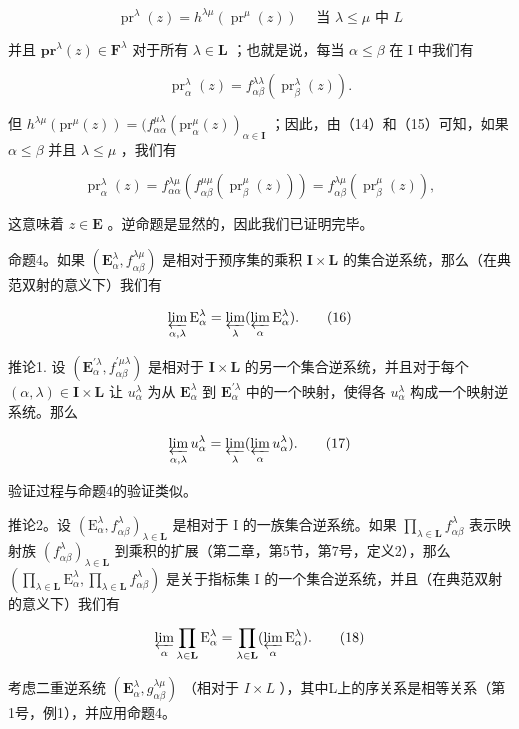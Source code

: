 \[
\operatorname{pr} ^ {\lambda} (z) = h ^ {\lambda \mu} (\operatorname{pr} ^ {\mu} (z)) \quad \text { 当 } \lambda \leqslant \mu \text { 中 } L\tag{14}
\]

并且 \(\mathbf{pr}^{\lambda}(z) \in \mathbf{F}^{\lambda}\) 对于所有 \(\lambda \in \mathbf{L}\) ；也就是说，每当 \(\alpha \leqslant \beta\) 在 I 中我们有

\[
\operatorname{pr} _ {\alpha} ^ {\lambda} (z) = f _ {\alpha \beta} ^ {\lambda \lambda} (\operatorname{pr} _ {\beta} ^ {\lambda} (z)).\tag{15}
\]

但 \(h^{\lambda \mu}(\mathrm{pr}^{\mu}(z)) = (f_{\alpha \alpha}^{\mu \lambda}(\mathrm{pr}_{\alpha}^{\mu}(z))_{\alpha \in \mathbf{I}}\) ；因此，由（14）和（15）可知，如果 \(\alpha \leqslant \beta\) 并且 \(\lambda \leqslant \mu\) ，我们有

\[
\operatorname{pr} _ {\alpha} ^ {\lambda} (z) = f _ {\alpha \alpha} ^ {\lambda \mu} (f _ {\alpha \beta} ^ {\mu \mu} (\operatorname{pr} _ {\beta} ^ {\mu} (z))) = f _ {\alpha \beta} ^ {\lambda \mu} (\operatorname{pr} _ {\beta} ^ {\mu} (z)),
\]

这意味着 \(z \in \mathbf{E}\) 。逆命题是显然的，因此我们已证明完毕。

命题4。如果 \((\mathbf{E}_{\alpha}^{\lambda}, f_{\alpha \beta}^{\lambda \mu})\) 是相对于预序集的乘积 \(\mathbf{I} \times \mathbf{L}\) 的集合逆系统，那么（在典范双射的意义下）我们有

\[
\varprojlim_ {\alpha , \lambda} \mathrm{E} _ {\alpha} ^ {\lambda} = \varprojlim_ {\lambda} (\varprojlim_ {\alpha} \mathrm{E} _ {\alpha} ^ {\lambda}).\tag{16}
\]

推论1. 设 \((\mathbf{E}_{\alpha}^{\prime \lambda}, f_{\alpha \beta}^{\prime \mu \lambda})\) 是相对于 \(\mathbf{I} \times \mathbf{L}\) 的另一个集合逆系统，并且对于每个 \((\alpha, \lambda) \in \mathbf{I} \times \mathbf{L}\) 让 \(u_{\alpha}^{\lambda}\) 为从 \(\mathbf{E}_{\alpha}^{\lambda}\) 到 \(\mathbf{E}_{\alpha}^{\prime \lambda}\) 中的一个映射，使得各 \(u_{\alpha}^{\lambda}\) 构成一个映射逆系统。那么

\[
\varprojlim_ {\alpha , \lambda} u _ {\alpha} ^ {\lambda} = \varprojlim_ {\lambda} (\varprojlim_ {\alpha} u _ {\alpha} ^ {\lambda}).\tag{17}
\]

验证过程与命题4的验证类似。

推论2。设 \((\mathrm{E}_{\alpha}^{\lambda}, f_{\alpha \beta}^{\lambda})_{\lambda \in \mathbf{L}}\) 是相对于 I 的一族集合逆系统。如果 \(\prod_{\lambda \in \mathbf{L}} f_{\alpha \beta}^{\lambda}\) 表示映射族 \((f_{\alpha \beta}^{\lambda})_{\lambda \in \mathbf{L}}\) 到乘积的扩展（第二章，第5节，第7号，定义2），那么 \(\left(\prod_{\lambda \in \mathbf{L}} \mathrm{E}_{\alpha}^{\lambda}, \prod_{\lambda \in \mathbf{L}} f_{\alpha \beta}^{\lambda}\right)\) 是关于指标集 I 的一个集合逆系统，并且（在典范双射的意义下）我们有

\[
\varprojlim_ {\alpha} \prod_ {\lambda \in \mathbf {L}} \mathrm{E} _ {\alpha} ^ {\lambda} = \prod_ {\lambda \in \mathbf {L}} (\varprojlim_ {\alpha} \mathrm{E} _ {\alpha} ^ {\lambda}).\tag{18}
\]

考虑二重逆系统 \((\mathbf{E}_{\alpha}^{\lambda}, g_{\alpha\beta}^{\lambda\mu})\) （相对于 \(I \times L\) ），其中L上的序关系是相等关系（第1号，例1），并应用命题4。

